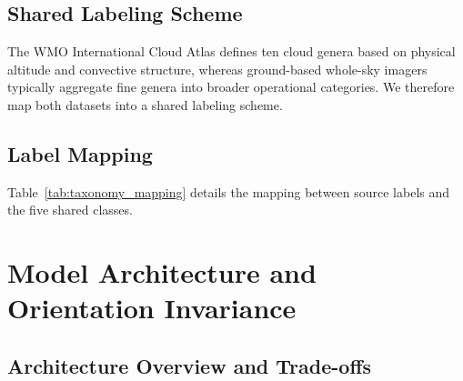 \documentclass[11pt,a4paper]{article}
\begin{document}
\subsection{Shared Labeling Scheme}

The WMO International Cloud Atlas defines ten cloud genera based on physical altitude and convective structure, whereas ground-based whole-sky imagers typically aggregate fine genera into broader operational categories. We therefore map both datasets into a shared labeling scheme.

\subsection{Label Mapping}

Table~\ref{tab:taxonomy_mapping} details the mapping between source labels and the five shared classes.

\begin{table}[!htbp]
\centering
\small
{}
\caption{Mapping CCSN and GCD into five shared cloud classes.}
\label{tab:taxonomy_mapping}
\end{table}

\section{Model Architecture and Orientation Invariance}
\label{sec:architecture}

\subsection{Architecture Overview and Trade-offs}
\end{document}

